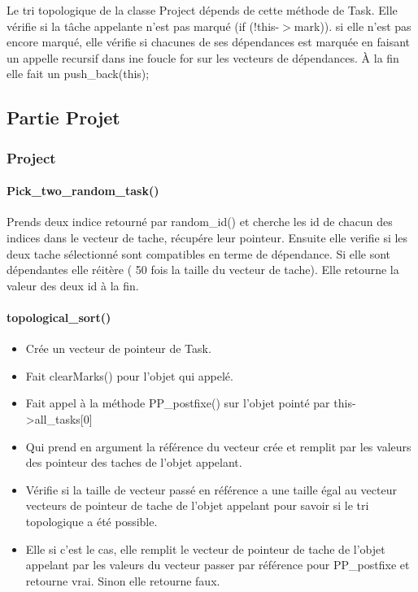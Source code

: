 \documentclass[paper=a4, fontsize=11pt, frenchb, englishb]{article}
\begin{document}
Le tri topologique de la classe Project dépends de cette méthode de Task. Elle vérifie si la tâche appelante n'est pas marqué (if (!this-$>$mark)). si elle n'est pas encore 
marqué, elle vérifie si chacunes de ses dépendances est marquée en faisant un appelle recursif dans ine foucle for sur les vecteurs de dépendances. À la fin elle fait un 
push\_back(this);

		
		\subsection{Partie Projet}
		
			\subsubsection{Project}
			
				\paragraph{Pick\_two\_random\_task()}
				
Prends deux indice retourné par random\_id() et cherche les id de chacun des indices dans le vecteur de tache, récupére leur pointeur. Ensuite elle verifie si les deux tache 
sélectionné sont compatibles en terme de dépendance. Si elle sont dépendantes elle réitère ( 50 fois la taille du vecteur de tache). Elle retourne la valeur des deux id à
la fin.

				\paragraph{topological\_sort()}
				
\begin{itemize}
	\item Crée un vecteur de pointeur de Task.
	\item Fait clearMarks() pour l'objet qui appelé. 
	\item Fait appel à la méthode PP\_postfixe() sur l'objet pointé par this->all\_tasks[0]
	\item Qui prend en argument la référence du vecteur crée et remplit par les valeurs des pointeur des taches de l'objet appelant. 
	\item Vérifie si la taille de vecteur passé en référence a une taille égal au vecteur vecteurs de pointeur de tache de l'objet appelant pour savoir si le tri topologique a été
	possible. 
	\item Elle si c'est le cas, elle remplit le vecteur de pointeur de tache de l'objet appelant par les valeurs du vecteur passer par référence pour PP\_postfixe et retourne vrai.
	Sinon elle retourne faux.
	
\end{itemize}
\end{document}
